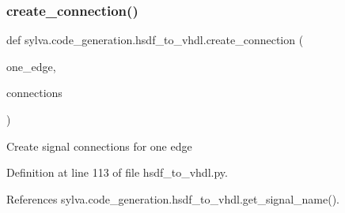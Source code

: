 \mbox{\label{namespacesylva_1_1code__generation_1_1hsdf__to__vhdl_a5381a4c2d460f5f0490d0361e37917e9}} 
\subsubsection{\texorpdfstring{create\+\_\+connection()}{create\_connection()}}
{\footnotesize\ttfamily def sylva.\+code\+\_\+generation.\+hsdf\+\_\+to\+\_\+vhdl.\+create\+\_\+connection (\begin{DoxyParamCaption}\item[{}]{one\+\_\+edge,  }\item[{}]{connections }\end{DoxyParamCaption})}

\begin{DoxyVerb}Create signal connections for one edge
\end{DoxyVerb}
 

Definition at line 113 of file hsdf\+\_\+to\+\_\+vhdl.\+py.



References sylva.\+code\+\_\+generation.\+hsdf\+\_\+to\+\_\+vhdl.\+get\+\_\+signal\+\_\+name().


